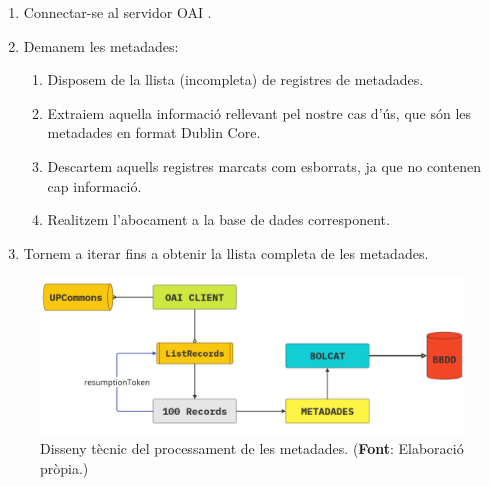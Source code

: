\begin{enumerate}
    \item Connectar-se al servidor \gls{OAI} .
    \item Demanem les metadades:
    \begin{enumerate}
        \item Disposem de la llista (incompleta) de registres de metadades.
        \item Extraiem aquella informació rellevant pel nostre cas d'ús, que són les metadades en format Dublin Core.
        \item Descartem aquells registres marcats com esborrats, ja que no contenen cap informació.
        \item Realitzem l'abocament a la base de dades corresponent.
    \end{enumerate}
    \item Tornem a iterar fins a obtenir la llista completa de les metadades.
\end{enumerate}

\begin{figure}[htbp]
    \centerline{\includegraphics[width=1\textwidth]{figures/metadata-processing}}
    \captionsetup{justification=centering}
    \caption[Disseny tècnic del processament de les metadades.]{Disseny tècnic del processament de les metadades. (\textbf{Font}: Elaboració pròpia.)}\label{fig:log-analysis}
\end{figure}
